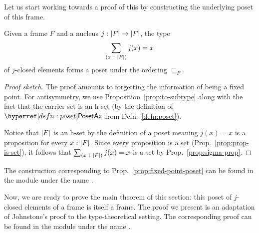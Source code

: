 Let us start working towards a proof of this by constructing the underlying poset of this
frame.
\begin{prop}\label{prop:fixed-point-poset}
  Given a frame $F$ and a nucleus $j\hspace{0.1mm}:\hspace{0.1mm}\left| F \right| \rightarrow \left| F \right|$, the type
  \begin{equation*}
    \sum_{(x~:~\left| F \right|)} j(x) = x
  \end{equation*}
   of $j$-closed elements forms a poset under the ordering $\sqsubseteq_F$.
\end{prop}
\begin{proof}[Proof sketch]
  The proof amounts to forgetting the information of being a fixed point. For
  antisymmetry, we use Proposition~\ref{prop:to-subtype} along with the fact that the
  carrier set is an h-set (by the definition of $\posetaxnm{}$ from
  Defn.~\ref{defn:poset}).

  Notice that $\left| F \right|$ is an h-set by the definition of a poset meaning $j(x) = x$ is a
  proposition for every $x\hspace{0.1mm}:\hspace{0.1mm}\left| F \right|$. Since every proposition is a set
  (Prop.~\ref{prop:prop-is-set}), it follows that $\sum_{(x~:~\left| F \right|)} j(x) = x$ is a
  set by Prop.~\ref{prop:sigma-prop}.
\end{proof}

The \veragda{} construction corresponding to Prop.~\ref{prop:fixed-point-poset} can be
found in the  module under the name .

Now, we are ready to prove the main theorem of this section: this poset of $j$-closed
elements of a frame is itself a frame. The proof we present is an adaptation of
Johnstone's proof \cite[II.2.2, pg.~49]{stone-spaces} to the type-theoretical setting. The
corresponding \veragda{} proof can be found in the  module under the name
.

